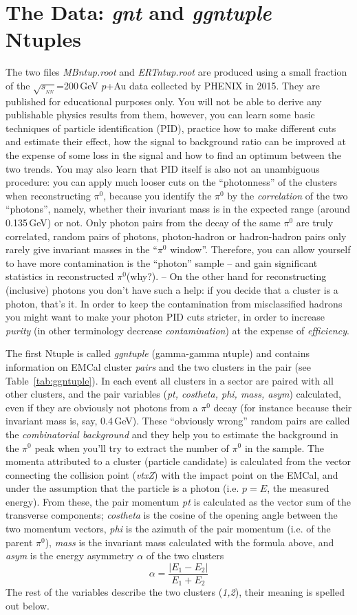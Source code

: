 \documentclass[pdftex,12pt,letter]{article}
\newcommand{\sqsn}{\mbox{$\sqrt{s_{_{NN}}}$}\xspace}
\newcommand{\piz}{\mbox{$\pi^0$}\xspace}
\newcommand{\gev}{\mbox{GeV}\xspace}
\begin{document}
\section{The Data:  {\it gnt} and {\it ggntuple} Ntuples}
The two files {\it MBntup.root} and {\it ERTntup.root} are produced
using a small fraction of the \sqsn=200\,GeV $p$+Au data collected by
PHENIX in 2015.  They are published for educational purposes only.
You will not be able to derive any publishable physics results from
them, however, you can learn some basic techniques of
particle identification (PID), practice how to make different cuts and
estimate their effect, how the signal to background ratio can be
improved at the expense of some loss in the signal and how to find an
optimum between the two trends.  You may also learn that PID itself is
also not an unambiguous procedure: you can apply much looser cuts on
the ``photonness'' of the clusters when reconstructing \piz, because
you identify the \piz by the {\it correlation} of the two ``photons'',
namely, whether their invariant mass is in the expected range (around
0.135\,\gev) or not.  Only photon pairs from the decay of the same
\piz are truly correlated, random pairs of photons, photon-hadron or
hadron-hadron pairs only rarely give invariant masses in the 
``\piz window''.  Therefore, you can allow yourself to have more
contamination is the ``photon'' sample -- and gain significant
statistics in reconstructed \piz (why?).  --  On the other hand for
reconstructing (inclusive) photons you don't have such a help: if you
decide that a cluster is a photon, that's it.  In order to keep the
contamination from misclassified hadrons you might want to make your
photon PID cuts stricter, in order to increase {\it purity} 
(in other terminology decrease {\it contamination}) at the
expense of {\it efficiency}.

The first Ntuple is called {\it ggntuple} (gamma-gamma ntuple) and
contains information on EMCal cluster {\it pairs} and the two clusters
in the pair (see Table~\ref{tab:ggntuple}).  In each event all
clusters in a sector are paired with all other clusters, and the pair
variables ({\it pt, costheta, phi, mass, asym}) calculated, even if
they are obviously not photons from a \piz decay (for instance because
their invariant mass is, say, 0.4\,\gev).  These ``obviously wrong''
random pairs are called the {\it combinatorial background} and they
help you to estimate the background in the \piz peak when you'll try
to extract the number of \piz in the sample.
The momenta attributed to a cluster (particle candidate) is calculated
from the vector connecting the collision point ({\it vtxZ}) with the
impact point on the EMCal, and under the assumption that the particle
is a photon (i.e. $p=E$, the measured energy).  From these, the pair
momentum {\it pt} is calculated as the vector sum of the transverse
components; {\it costheta} is the cosine of the opening angle between
the two momentum vectors, {\it phi} is the azimuth of the pair
momentum (i.e. of the parent \piz), {\it mass} is the invariant mass
calculated with the formula above, and {\it asym} is the energy
asymmetry $\alpha$ of the two clusters
$$\alpha = \frac{|E_1-E_2|}{E_1+E_2}$$
The rest of the variables describe the two clusters ({\it 1,2}), their
meaning is spelled out below.
\end{document}
